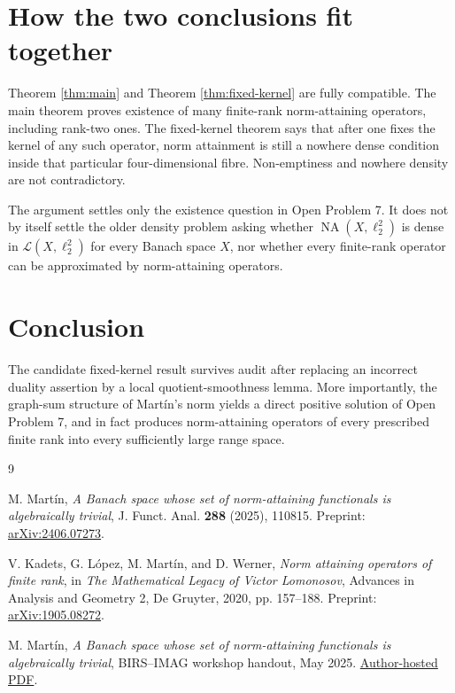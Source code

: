 \documentclass[11pt]{article}
\theoremstyle{definition}
\newcommand{\NA}{\operatorname{NA}}
\newcommand{\calL}{\mathcal L}
\begin{document}
\section{How the two conclusions fit together}

Theorem \ref{thm:main} and Theorem \ref{thm:fixed-kernel} are fully
compatible.  The main theorem proves existence of many finite-rank
norm-attaining operators, including rank-two ones.  The fixed-kernel theorem
says that after one fixes the kernel of any such operator, norm attainment is
still a nowhere dense condition inside that particular four-dimensional
fibre.  Non-emptiness and nowhere density are not contradictory.

The argument settles only the existence question in Open Problem 7.  It does
not by itself settle the older density problem asking whether
\(\NA(X,\ell_2^2)\) is dense in \(\calL(X,\ell_2^2)\) for every Banach space
\(X\), nor whether every finite-rank operator can be approximated by
norm-attaining operators.

\section*{Conclusion}

The candidate fixed-kernel result survives audit after replacing an incorrect
duality assertion by a local quotient-smoothness lemma.  More importantly,
the graph-sum structure of Mart\'in's norm yields a direct positive solution of
Open Problem 7, and in fact produces norm-attaining operators of every
prescribed finite rank into every sufficiently large range space.

\begin{thebibliography}{9}

M. Mart\'in,
\emph{A Banach space whose set of norm-attaining functionals is algebraically
trivial},
J. Funct. Anal. \textbf{288} (2025), 110815.
Preprint: \href{https://arxiv.org/abs/2406.07273}{arXiv:2406.07273}.

V. Kadets, G. L\'opez, M. Mart\'in, and D. Werner,
\emph{Norm attaining operators of finite rank},
in \emph{The Mathematical Legacy of Victor Lomonosov},
Advances in Analysis and Geometry 2, De Gruyter, 2020, pp. 157--188.
Preprint: \href{https://arxiv.org/abs/1905.08272}{arXiv:1905.08272}.

M. Mart\'in,
\emph{A Banach space whose set of norm-attaining functionals is algebraically
trivial}, BIRS--IMAG workshop handout, May 2025.
\href{https://www.ugr.es/~mmartins/Curriculum/Charlas/2025_BIRS_handout.pdf}
{Author-hosted PDF}.

\end{thebibliography}
\end{document}
